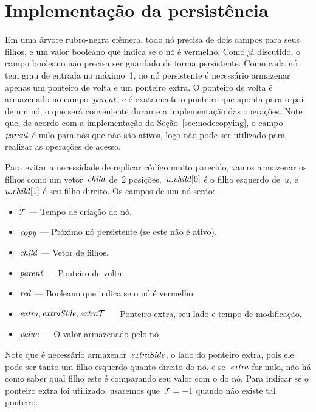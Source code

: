 \documentclass[../../main.tex]{subfiles}
\begin{document}
\section{Implementação da persistência}

\newcommand{\ts}{\mathcal{T}}
\renewcommand{\copy}{\V{copy}}
\newcommand{\child}{\V{child}}
\newcommand{\parent}{\V{parent}}
\newcommand{\red}{\V{red}}
\newcommand{\extra}{\V{extra}}
\newcommand{\eSide}{\V{extraSide}}
\newcommand{\eTs}{\V{extra\mathcal{T}}}
\newcommand{\version}{\V{version}}
\newcommand{\side}{\V{side}}
\newcommand{\roots}{\V{roots}}
\newcommand{\val}{\V{value}}


Em uma árvore rubro-negra efêmera, todo nó precisa de dois campos para seus filhos, e um valor booleano que indica se o nó é vermelho. Como já discutido, o campo booleano não precisa ser guardado de forma persistente. Como cada nó tem grau de entrada no máximo~1, no nó persistente é necessário armazenar apenas um ponteiro de volta e um ponteiro extra. O ponteiro de volta é armazenado no campo~$\parent$, e é exatamente o ponteiro que aponta para o pai de um nó, o que será conveniente durante a implementação das operações. Note que, de acordo com a implementação da Seção~\ref{sec:nodecopying}, o campo~$\parent$ é nulo para nós que não são ativos, logo não pode ser utilizado para realizar as operações de acesso.

Para evitar a necessidade de replicar código muito parecido, vamos armazenar os filhos como um vetor~$\child$ de~2 posições,~$u.\child[0]$ é o filho esquerdo de~$u$, e~$u.\child[1]$ é seu filho direito. Os campos de um nó serão:
\begin{itemize}
\item $\ts$ --- Tempo de criação do nó.
\item $\copy$ --- Próximo nó persistente (se este não é ativo).
\item $\child$ --- Vetor de filhos.
\item $\parent$ --- Ponteiro de volta.
\item $\red$ --- Booleano que indica se o nó é vermelho.
\item $\extra, \eSide, \eTs$ --- Ponteiro extra, seu lado e tempo de modificação.
\item $\val$ --- O valor armazenado pelo nó
\end{itemize}

Note que é necessário armazenar~$\eSide$, o lado do ponteiro extra, pois ele pode ser tanto um filho esquerdo quanto direito do nó, e se~$\extra$ for nulo, não há como saber qual filho este é comparando seu valor com o do nó. Para indicar se o ponteiro extra foi utilizado, usaremos que~$\ts = -1$ quando não existe tal ponteiro.
\end{document}
